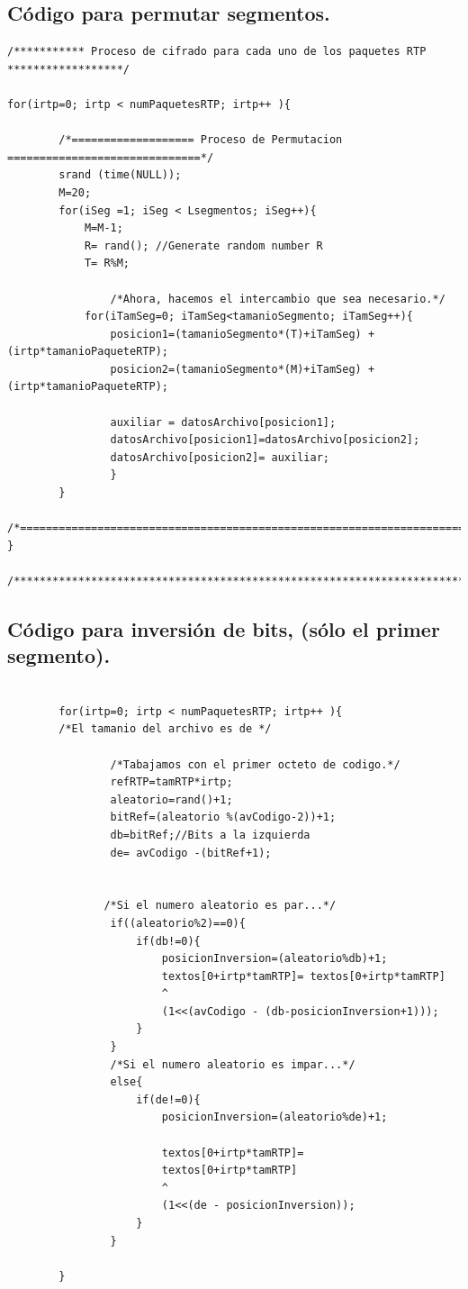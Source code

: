 \documentclass[10pt]{IEEEtran}
\begin{document}
\subsection{Código para permutar segmentos.}
\begin{verbatim}
/*********** Proceso de cifrado para cada uno de los paquetes RTP ******************/

for(irtp=0; irtp < numPaquetesRTP; irtp++ ){

        /*=================== Proceso de Permutacion ==============================*/	
		srand (time(NULL));
		M=20;
		for(iSeg =1; iSeg < Lsegmentos; iSeg++){
			M=M-1;
			R= rand(); //Generate random number R
			T= R%M;
		
	    		/*Ahora, hacemos el intercambio que sea necesario.*/
       		for(iTamSeg=0; iTamSeg<tamanioSegmento; iTamSeg++){
				posicion1=(tamanioSegmento*(T)+iTamSeg) + (irtp*tamanioPaqueteRTP);
				posicion2=(tamanioSegmento*(M)+iTamSeg) + (irtp*tamanioPaqueteRTP);

				auxiliar = datosArchivo[posicion1];
				datosArchivo[posicion1]=datosArchivo[posicion2];
				datosArchivo[posicion2]= auxiliar;
	    		}	
	    }
        /*=========================================================================*/
}

/***********************************************************************************/
\end{verbatim}



\subsection{Código para inversión de bits, (sólo el primer segmento).}

\begin{verbatim}

        for(irtp=0; irtp < numPaquetesRTP; irtp++ ){
		/*El tamanio del archivo es de */
                
                /*Tabajamos con el primer octeto de codigo.*/
                refRTP=tamRTP*irtp;
                aleatorio=rand()+1;
                bitRef=(aleatorio %(avCodigo-2))+1;
                db=bitRef;//Bits a la izquierda
                de= avCodigo -(bitRef+1);
	

               /*Si el numero aleatorio es par...*/
                if((aleatorio%2)==0){  
					if(db!=0){
						posicionInversion=(aleatorio%db)+1;
						textos[0+irtp*tamRTP]= textos[0+irtp*tamRTP]
						^
						(1<<(avCodigo - (db-posicionInversion+1)));                  
					}
                }
	            /*Si el numero aleatorio es impar...*/
                else{
		            if(de!=0){		
				        posicionInversion=(aleatorio%de)+1;
			
		                textos[0+irtp*tamRTP]=
		                textos[0+irtp*tamRTP]
		                ^
		                (1<<(de - posicionInversion));                              
			        }
                }

        }


\end{verbatim}
\end{document}
